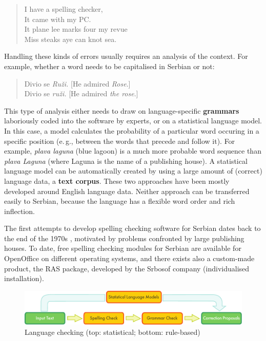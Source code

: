 \begin{multicols}{2}
\begin{quote}
 I have a spelling checker, \\
 It came with my PC. \\
 It plane lee marks four my revue \\
 Miss steaks aye can knot sea. 
\end{quote}

Handling these kinds of errors usually requires an analysis of the context. For example, whether a word needs to be capitalised in Serbian or not:

\begin{quote}
Divio se \textit{Ruži.} [He admired \textit{Rose}.]\\
Divio se \textit{ruži.} [He admired \textit{the rose}.]
\end{quote}

This type of analysis either needs to draw on language-specific \textbf{grammars} laboriously coded into the software by experts, or on a statistical language model. In this case, a model calculates the probability of a particular word occuring in a specific position (e.\,g., between the words that precede and follow it). For example, \textit{plava laguna} (blue lagoon) is a much more probable word sequence than \textit{plava Laguna} (where Laguna is the name of a publishing house). A statistical language model can be automatically created by using a large amount of (correct) language data, a \textbf{text corpus}. These two approaches have been mostly developed around English language data. Neither approach can be transferred easily to Serbian, because the language has a flexible word order and rich inflection.


The first attempts to develop spelling checking software for Serbian dates back to the end of the 1970s \cite{UROSEVIC}, motivated by problems confronted by large publishing houses. To date, free spelling checking modules for Serbian are available for OpenOffice \cite{OpenOffice} on different operating systems, and there exists also a custom-made product, the RAS package, \cite{RASPROG} developed by the Srbosof company (individualised installation).  
 
\begin{figure}[htb]
  \center
  \includegraphics[width=\textwidth]{../_media/english/language_checking}
  \caption{Language checking (top: statistical; bottom: rule-based)}
  \label{fig:langcheckingaarch_en}
\end{figure}


\end{multicols}
